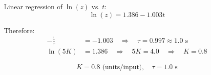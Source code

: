 \begin{examplebox}
Linear regression of $\ln(z)$ vs. $t$:
\begin{equation*}
\ln(z) = 1.386 - 1.003 t
\end{equation*}

Therefore:
\begin{align*}
-\frac{1}{\tau} &= -1.003 \quad \Rightarrow \quad \tau = 0.997 \approx 1.0 \text{ s} \\
\ln(5K) &= 1.386 \quad \Rightarrow \quad 5K = 4.0 \quad \Rightarrow \quad K = 0.8
\end{align*}

\begin{equation*}
\boxed{K = 0.8 \text{ (units/input)}, \quad \tau = 1.0 \text{ s}}
\end{equation*}
\end{examplebox}

